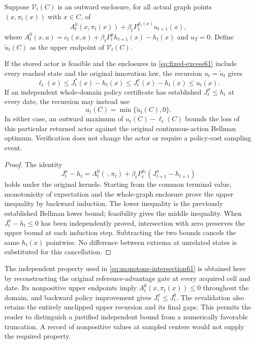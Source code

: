 Suppose $\mathcal V_t(C)$ is an outward enclosure, for all actual graph points $(x,\pi_t(x))$ with $x\in C$, of
\begin{equation}\label{eq:fixed-excess61}
 A_t^0(x,\pi_t(x))+
       \beta_t P_t^{\pi_t(x)}u_{t+1}(x),
\end{equation}
where $A_t^0(x,a)=c_t(x,a)+\beta_tP_t^a h_{t+1}(x)-h_t(x)$ and $u_T=0$. Define $\widetilde u_t(C)$ as the upper endpoint of $\mathcal V_t(C)$.

\begin{proposition}\label{prop:fixed-policy61}
If the stored actor is feasible and the enclosures in \eqref{eq:fixed-excess61} include every reached state and the original innovation law, the recursion $u_t=\widetilde u_t$ gives
\[
 \ell_t(x)\le J_t^*(x)-h_t(x)
       \le J_t^\pi(x)-h_t(x)\le u_t(x).
\]
If an independent whole-domain policy certificate has established $J_t^\pi\le h_t$ at every date, the recursion may instead use
\begin{equation}\label{eq:monotone-intersection61}
 u_t(C)=\min\{\widetilde u_t(C),0\}.
\end{equation}
In either case, an outward maximum of $u_t(C)-\ell_t(C)$ bounds the loss of this particular returned actor against the original continuous-action Bellman optimum. Verification does not change the actor or require a policy-cost sampling event.
\end{proposition}
\begin{proof}
The identity
\[
 J_t^\pi-h_t=A_t^0(\cdot,\pi_t)
       +\beta_tP_t^{\pi_t}(J_{t+1}^\pi-h_{t+1})
\]
holds under the original kernels. Starting from the common terminal value, monotonicity of expectation and the whole-graph enclosure prove the upper inequality by backward induction. The lower inequality is the previously established Bellman lower bound; feasibility gives the middle inequality. When $J_t^\pi-h_t\le0$ has been independently proved, intersection with zero preserves the upper bound at each induction step. Subtracting the two bounds cancels the same $h_t(x)$ pointwise. No difference between extrema at unrelated states is substituted for this cancellation.
\end{proof}

The independent property used in \eqref{eq:monotone-intersection61} is obtained here by reconstructing the original reference-advantage gate at every acquired cell and date. Its nonpositive upper endpoints imply $A_t^0(x,\pi_t(x))\le0$ throughout the domain, and backward policy improvement gives $J_t^\pi\le J_t^0$. The revalidation also retains the entirely unclipped upper recursion and its final gaps. This permits the reader to distinguish a justified independent bound from a numerically favorable truncation. A record of nonpositive values at sampled centers would not supply the required property.

